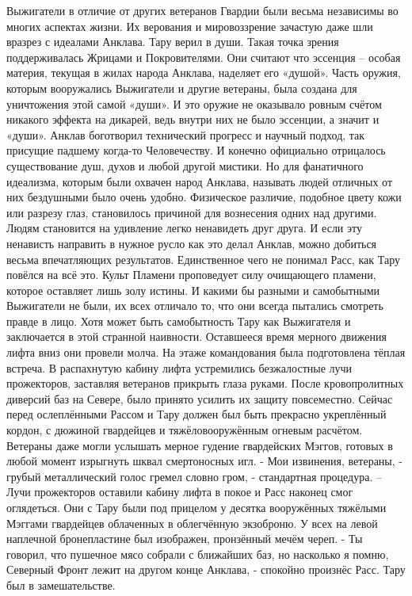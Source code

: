 \documentclass[a4paper, 12pt]{report}
\begin{document}
Выжигатели в отличие от других ветеранов Гвардии были весьма независимы во многих аспектах жизни. Их верования и мировоззрение зачастую даже шли вразрез с идеалами Анклава. Тару верил в души. Такая точка зрения поддерживалась Жрицами и Покровителями. Они считают что эссенция – особая материя, текущая в жилах народа Анклава, наделяет его «душой». Часть оружия, которым вооружались Выжигатели и другие ветераны, была создана для уничтожения этой самой «души». И это оружие не оказывало ровным счётом никакого эффекта на дикарей, ведь внутри них не было эссенции, а значит и «души». Анклав боготворил технический прогресс и научный подход, так присущие падшему когда-то Человечеству. И конечно официально отрицалось существование душ, духов и любой другой мистики. Но для фанатичного идеализма, которым были охвачен народ Анклава, называть людей отличных от них бездушными было очень удобно. Физическое различие, подобное цвету кожи или разрезу глаз, становилось причиной для  вознесения одних над другими. Людям становится на удивление легко ненавидеть друг друга. И если эту ненависть направить в нужное русло как это делал Анклав, можно добиться весьма впечатляющих результатов. 
Единственное чего не понимал Расс, как Тару повёлся на всё это. Культ Пламени проповедует силу очищающего пламени, которое оставляет лишь золу истины. И какими бы разными и самобытными Выжигатели не были, их всех отличало то, что они всегда пытались смотреть правде в лицо. Хотя может быть самобытность Тару как Выжигателя и заключается в этой странной наивности.
Оставшееся время мерного движения лифта вниз они провели молча.
На этаже командования была подготовлена тёплая встреча. В распахнутую кабину лифта устремились безжалостные лучи прожекторов, заставляя ветеранов прикрыть глаза руками. 
После кровопролитных диверсий баз на Севере, было принято усилить их защиту повсеместно. Сейчас перед ослеплёнными Рассом и Тару должен был быть прекрасно укреплённый кордон, с дюжиной гвардейцев и тяжёловооружённым огневым расчётом. Ветераны даже могли услышать мерное гудение гвардейских Мэггов, готовых в любой момент изрыгнуть шквал смертоносных игл.
- Мои извинения, ветераны, - грубый металлический голос гремел словно гром, - стандартная процедура. –
 	Лучи прожекторов оставили кабину лифта в покое и Расс наконец смог оглядеться. Они с Тару были под прицелом у десятка вооружённых тяжёлыми Мэггами гвардейцев облаченных в облегчённую экзоброню. У всех на левой наплечной бронепластине был изображен, пронзённый мечём череп. 
	- Ты говорил, что пушечное мясо собрали с ближайших баз, но насколько я помню, Северный Фронт лежит на другом конце Анклава, - спокойно произнёс Расс. Тару был в замешательстве.
\end{document}

